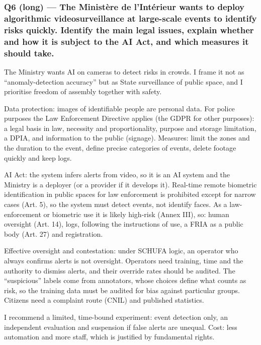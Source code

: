 \documentclass[11pt,a4paper]{article}
\newcommand{\blk}[1]{{\setlength{\fboxsep}{2pt}\colorbox{ink}{\sffamily\footnotesize\bfseries\color{white}\,#1\,}}}
\begin{document}
\subsubsection*{Q6 (long) — The Ministère de l’Intérieur wants to deploy algorithmic videosurveillance at large-scale events to identify risks quickly. Identify the main legal issues, explain whether and how it is subject to the AI Act, and which measures it should take.}
\begin{description}[leftmargin=1.2cm,style=sameline]
\item[\blk{F}] The Ministry wants AI on cameras to detect risks in crowds. I frame it not as “anomaly-detection accuracy” but as State surveillance of public space, and I prioritise freedom of assembly together with safety.
\item[\blk{A1}] Data protection: images of identifiable people are personal data. For police purposes the Law Enforcement Directive applies (the GDPR for other purposes): a legal basis in law, necessity and proportionality, purpose and storage limitation, a DPIA, and information to the public (signage). Measures: limit the zones and the duration to the event, define precise categories of events, delete footage quickly and keep logs.
\item[\blk{A2}] AI Act: the system infers alerts from video, so it is an AI system and the Ministry is a deployer (or a provider if it develops it). Real-time remote biometric identification in public spaces for law enforcement is prohibited except for narrow cases (Art. 5), so the system must detect events, not identify faces. As a law-enforcement or biometric use it is likely high-risk (Annex III), so: human oversight (Art. 14), logs, following the instructions of use, a FRIA as a public body (Art. 27) and registration.
\item[\blk{A3}] Effective oversight and contestation: under SCHUFA logic, an operator who always confirms alerts is not oversight. Operators need training, time and the authority to dismiss alerts, and their override rates should be audited. The “suspicious” labels come from annotators, whose choices define what counts as risk, so the training data must be audited for bias against particular groups. Citizens need a complaint route (CNIL) and published statistics.
\item[\blk{R}] I recommend a limited, time-bound experiment: event detection only, an independent evaluation and suspension if false alerts are unequal. Cost: less automation and more staff, which is justified by fundamental rights.
\end{description}
\end{document}
